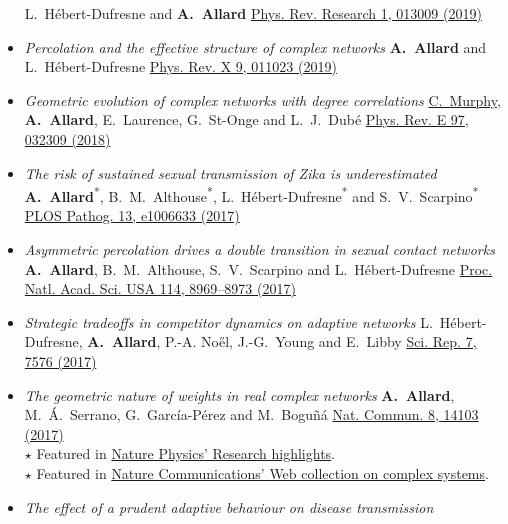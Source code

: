 \documentclass[11pt]{article}
\begin{document}
\begin{itemize}[itemsep=0.5em]
  L.~H\'ebert-Dufresne and \textbf{A.~Allard}\split
  \href{http://doi.org/10.1103/PhysRevResearch.1.013009}{Phys. Rev. Research 1, 013009 (2019)}
%
  \item \textit{Percolation and the effective structure of complex networks}\split
  \textbf{A.~Allard} and L.~H\'ebert-Dufresne\split
  \href{http://doi.org/10.1103/PhysRevX.9.011023}{Phys. Rev. X 9, 011023 (2019)}
%
  \item \textit{Geometric evolution of complex networks with degree correlations}\split
  \uline{C.~Murphy}, \textbf{A.~Allard}, E.~Laurence, G.~St-Onge and L.~J.~Dub\'e\split
  \href{http://doi.org/10.1103/PhysRevE.97.032309}{Phys. Rev. E 97, 032309 (2018)}
%
  \item \textit{The risk of sustained sexual transmission of Zika is underestimated}\split
  \textbf{A.~Allard}\textsuperscript{*}, B.~M.~Althouse\textsuperscript{*}, L.~H\'ebert-Dufresne\textsuperscript{*} and S.~V.~Scarpino\textsuperscript{*}\split
  \href{http://dx.doi.org/10.1371/journal.ppat.1006633}{PLOS Pathog. 13, e1006633 (2017)}
%
  \item \textit{Asymmetric percolation drives a double transition in sexual contact networks}\split
  \textbf{A.~Allard}, B.~M.~Althouse, S.~V.~Scarpino and L.~H\'ebert-Dufresne\split
  \href{http://dx.doi.org/10.1073/pnas.1703073114}{Proc. Natl. Acad. Sci. USA 114, 8969--8973 (2017)}
%
  \item \textit{Strategic tradeoffs in competitor dynamics on adaptive networks}\split
  L.~H\'ebert-Dufresne, \textbf{A.~Allard}, P.-A. No\H{e}l, J.-G.~Young and E.~Libby\split
  \href{http://dx.doi.org/10.1038/s41598-017-07621-x}{Sci. Rep. 7, 7576 (2017)}
%
  \item \textit{The geometric nature of weights in real complex networks}\split
  \textbf{A.~Allard}, M.~\'A.~Serrano, G.~Garc\'ia-P\'erez and M.~Bogu\~n\'a\split
  \href{http://doi.org/10.1038/ncomms14103}{Nat. Commun. 8, 14103 (2017)}\\
  {\footnotesize $\star$ Featured in \href{http://dx.doi.org/10.1038/nphys4046}{Nature Physics' Research highlights}.}\\
  {\footnotesize $\star$ Featured in \href{https://www.nature.com/collections/ycjylwzvmz/}{Nature Communications' Web collection on complex systems}.}
%
  \item \textit{The effect of a prudent adaptive behaviour on disease transmission}\split

\end{itemize}
\end{document}
